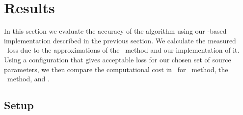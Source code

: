 \section{Results}
\label{sec:results}

In this section we evaluate the accuracy of the \lloid{} algorithm using our 
\gstreamer{}-based implementation described in the previous section. We calculate the
measured \SNR\ loss due to the approximations of the \lloid\ method and our
implementation of it. Using a configuration that gives acceptable \SNR{} loss for
our chosen set of source parameters, we then compare the computational cost in \flops\
for \TD\ method, the \FD\ method, and \lloid.

\subsection{Setup}
\label{sec:bank-setup}

